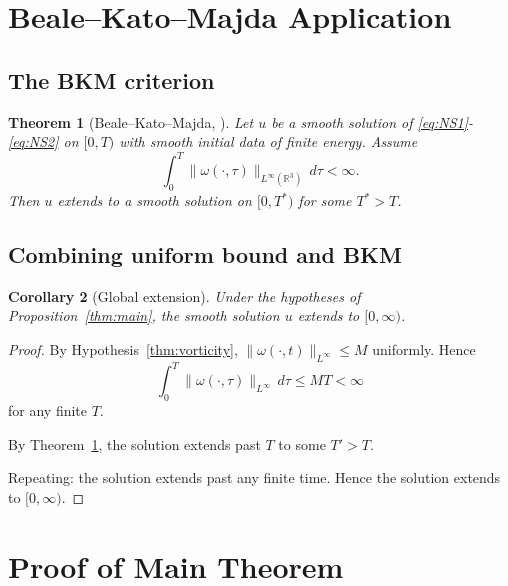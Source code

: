 \documentclass[11pt, a4paper]{amsart}
\newtheorem{theorem}{Theorem}[section]
\newtheorem{corollary}[theorem]{Corollary}
\theoremstyle{definition}
\newcommand{\R}{\mathbb{R}}
\begin{document}

\section{Beale--Kato--Majda Application}\label{sec:BKM}

\subsection{The BKM criterion}

\begin{theorem}[Beale--Kato--Majda, \cite{BKM}]\label{thm:BKM}
Let $u$ be a smooth solution of \eqref{eq:NS1}-\eqref{eq:NS2} on
$[0, T)$ with smooth initial data of finite energy. Assume
\[
\int_0^T \|\omega(\cdot, \tau)\|_{L^\infty(\R^3)} \, d\tau < \infty.
\]
Then $u$ extends to a smooth solution on $[0, T^*)$ for some $T^* > T$.
\end{theorem}

\subsection{Combining uniform bound and BKM}

\begin{corollary}[Global extension]\label{cor:globalext}
Under the hypotheses of Proposition~\ref{thm:main}, the smooth solution
$u$ extends to $[0, \infty)$.
\end{corollary}

\begin{proof}
By Hypothesis~\ref{thm:vorticity}, $\|\omega(\cdot, t)\|_{L^\infty} \leq M$
uniformly. Hence
\[
\int_0^T \|\omega(\cdot, \tau)\|_{L^\infty} \, d\tau \leq M T < \infty
\]
for any finite $T$.

By Theorem~\ref{thm:BKM}, the solution extends past $T$ to some
$T' > T$.

Repeating: the solution extends past any finite time. Hence the
solution extends to $[0, \infty)$.
\end{proof}

\section{Proof of Main Theorem}\label{sec:proof}
\end{document}
